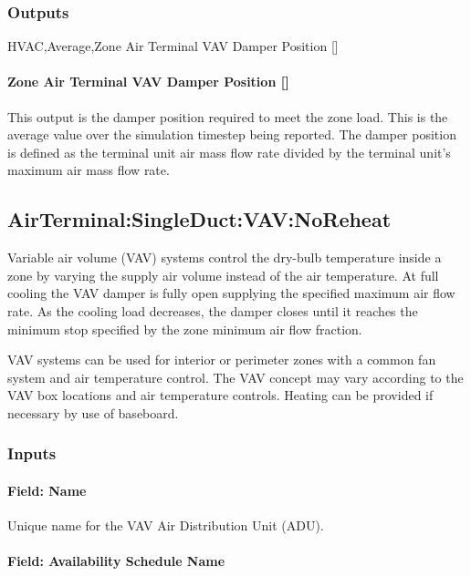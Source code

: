 \subsubsection{Outputs}\label{outputs-4}

HVAC,Average,Zone Air Terminal VAV Damper Position {[]}

\paragraph{\texorpdfstring{Zone Air Terminal VAV Damper Position {[]}}{Zone Air Terminal VAV Damper Position }}\label{zone-air-terminal-vav-damper-position-2}

This output is the damper position required to meet the zone load. This is the average value over the simulation timestep being reported. The damper position is defined as the terminal unit air mass flow rate divided by the terminal unit's maximum air mass flow rate.

\subsection{AirTerminal:SingleDuct:VAV:NoReheat}\label{airterminalsingleductvavnoreheat}

Variable air volume (VAV) systems control the dry-bulb temperature inside a zone by varying the supply air volume instead of the air temperature. At full cooling the VAV damper is fully open supplying the specified maximum air flow rate. As the cooling load decreases, the damper closes until it reaches the minimum stop specified by the zone minimum air flow fraction.

VAV systems can be used for interior or perimeter zones with a common fan system and air temperature control. The VAV concept may vary according to the VAV box locations and air temperature controls. Heating can be provided if necessary by use of baseboard.

\subsubsection{Inputs}\label{inputs-5-000}

\paragraph{Field: Name}\label{field-name-5-000}

Unique name for the VAV Air Distribution Unit (ADU).

\paragraph{Field: Availability Schedule Name}\label{field-availability-schedule-name-5}

